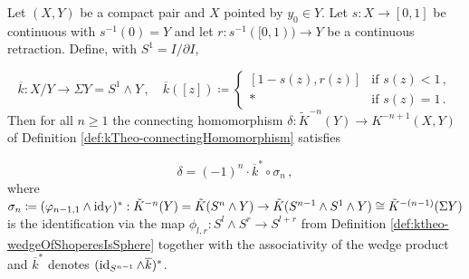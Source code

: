 \begin{lemma}\label{lem:morseFilt-connectingHomomorphismAlongACollar}
Let $(X,Y)$ be a compact pair and $X$ pointed by $y_0\in Y$. Let $s:X\to [0,1]$ be continuous with $s^{-1}(0)=Y$ and let $r:s^{-1}([0,1))\to Y$ be a continuous retraction. Define, with $S^1=I/\partial I$,	

\begin{equation*}
	\overline{k}:X/Y \to \Sigma Y=S^1\wedge Y\,, \quad
	\overline{k}([z])\coloneq
		\begin{cases}
			[1-s(z),r(z)] &\text{if } s(z)<1\,,\\
			* 			  &\text{if } s(z)=1 \,.
		\end{cases}
\end{equation*}
Then for all $n\geq 1$ the connecting homomorphism $\delta :\tilde{K}^{-n}(Y)\to K^{-n+1}(X,Y)$ of Definition \ref{def:kTheo-connectingHomomorphism} satisfies

\begin{equation*}
	\delta=(-1)^n\cdot \overline{k}^*\circ \sigma_n\,,
\end{equation*} where $\sigma_n\coloneq (\varphi_{n-1,1} \wedge \operatorname{\mathrm{id}}_Y)^*:\tilde{K}^{-n}(Y)= \tilde{K}(S^n\wedge Y)\to \tilde{K}(S^{n-1}\wedge S^1\wedge Y) \cong \tilde{K}^{-(n-1)}(\Sigma Y)$ is the identification via the map $\phi_{l,r}:S^l\wedge S^r\to S^{l+r}$ from Definition \ref{def:ktheo-wedgeOfShoperesIsSphere} together with the associativity of the wedge product and $\overline{k}^*$ denotes $(\operatorname{\mathrm{id}}_{S^{n-1}}\wedge \overline{k})^*$.
\end{lemma}

